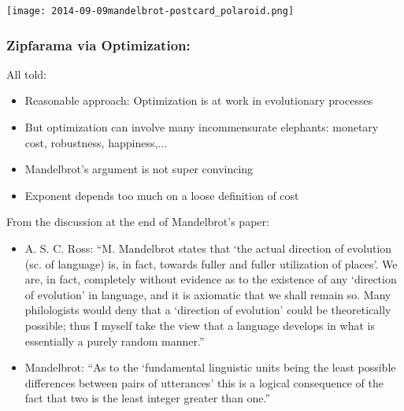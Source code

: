 \begin{frame}
  \texttt{[image: 2014-09-09mandelbrot-postcard\_polaroid.png]}
\end{frame}

\begin{frame}
  \frametitle{Zipfarama via Optimization:}

  \begin{block}{All told:}
    \begin{itemize}
    \item<+-> 
      Reasonable approach: Optimization is at work in evolutionary processes
    \item<+-> 
      But optimization can involve many incommensurate elephants:
      monetary cost, robustness, happiness,...
    \item<+-> 
      Mandelbrot's argument is not super convincing
    \item<+-> 
      Exponent depends too much on a loose definition of cost
    \end{itemize}
  \end{block}

\end{frame}


\begin{frame}

  \begin{block}{From the discussion at the end of Mandelbrot's paper:}
    \begin{itemize}
    \item
      A. S. C. Ross: 
      ``M. Mandelbrot states that `the actual direction of evolution
      (sc. of language) is, in fact, towards fuller and fuller utilization
      of places'. We are, in fact, completely without evidence as to the
      existence of any `direction of evolution' in language, and it is
      axiomatic that we shall remain so. Many philologists would deny that a
      `direction of evolution' could be theoretically possible; thus I
      myself take the view that a language develops in what is essentially a
      purely random manner.''
    \item
      Mandelbrot: ``As to the `fundamental linguistic units being the least possible
      differences between pairs of utterances' this is a logical consequence
      of the fact that two is the least integer greater than one.''
    \end{itemize}
  \end{block}

\end{frame}

